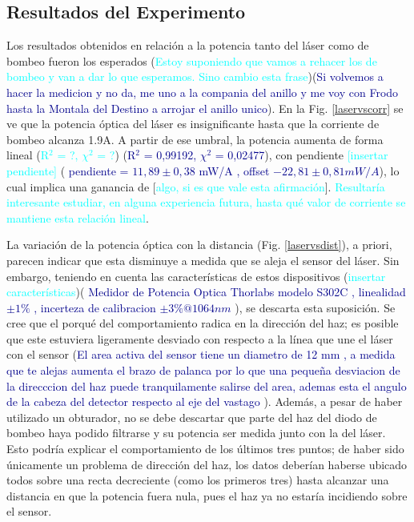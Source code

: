 \documentclass[10pt, a4paper]{article}%
\begin{document}
\begin{multicols}{2}

\section{Resultados del Experimento}

Los resultados obtenidos en relación a la potencia tanto del láser como de bombeo fueron los esperados (\textcolor{cyan}{Estoy suponiendo que vamos a rehacer los de bombeo y van a dar lo que esperamos. Sino cambio esta frase})({\textcolor{DarkBlue}{Si volvemos a hacer la medicion y no da, me uno a la compania del anillo y me voy con Frodo hasta la Montala del Destino a arrojar el anillo unico}}). En la Fig. \ref{laservscorr} se ve que la potencia óptica del láser es insignificante hasta que la corriente de bombeo alcanza 1.9A. A partir de ese umbral, la potencia aumenta de forma lineal (\textcolor{cyan}{R$^2$ = ?, $\chi^2$ = ?}) (\textcolor{DarkBlue}{R$^2$ = 0,99192, $\chi^2$ = 0,02477}), con pendiente \textcolor{cyan}{[insertar pendiente]} (\textcolor{DarkBlue}{ pendiente = ${ 11,89 \pm 0,38}$ mW/A , offset ${ -22,81 \pm 0,81 mW/A }$}), lo cual implica una ganancia de [\textcolor{cyan}{algo, si es que vale esta afirmación}]. \textcolor{cyan}{Resultaría interesante estudiar, en alguna experiencia futura, hasta qué valor de corriente se mantiene esta relación lineal}. 

La variación de la potencia óptica con la distancia (Fig. \ref{laservsdist}), a priori, parecen indicar que esta disminuye a medida que se aleja el sensor del láser. Sin embargo, teniendo en cuenta las características de estos dispositivos (\textcolor{cyan}{insertar características})(\textcolor{DarkBlue}{ Medidor de Potencia Optica Thorlabs modelo S302C , linealidad ${\pm 1\%}$ , incerteza de calibracion ${ \pm 3\% @ 1064 nm }$ }), se descarta esta suposición. Se cree que el porqué del comportamiento radica en la dirección del haz; es posible que este estuviera ligeramente desviado con respecto a la línea que une el láser con el sensor (\textcolor{DarkBlue}{El area activa del sensor tiene un diametro de 12 mm , a medida que te alejas aumenta el brazo de palanca por lo que una pequeña desviacion de la direcccion del haz puede tranquilamente salirse del area, ademas esta el angulo de la cabeza del detector respecto al eje del vastago }). Además, a pesar de haber utilizado un obturador, no se debe descartar que parte del haz del diodo de bombeo haya podido filtrarse y su potencia ser medida junto con la del láser. Esto podría explicar el comportamiento de los últimos tres puntos; de haber sido únicamente un problema de dirección del haz, los datos deberían haberse ubicado todos sobre una recta decreciente (como los primeros tres) hasta alcanzar una distancia en que la potencia fuera nula, pues el haz ya no estaría incidiendo sobre el sensor. 


\end{multicols}
\end{document}

